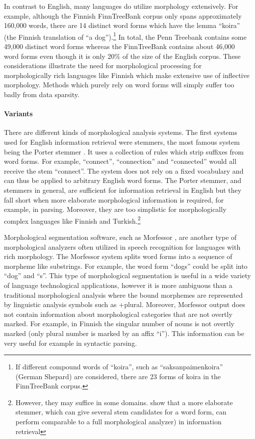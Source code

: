 In contrast to English, many languages do utilize morphology
extensively. For example, although the Finnish FinnTreeBank corpus
\citep{Voutilainen2011} only spans approximately 160,000 words, there
are 14 distinct word forms which have the lemma ``koira'' (the Finnish
translation of ``a dog'').\footnote{If different compound words of
  ``koira'', such as ``saksanpaimenkoira'' (German Shepard) are
  considered, there are 23 forms of koira in the FinnTreeBank corpus.}
In total, the Penn Treebank contains some 49,000 distinct word forms
whereas the FinnTreeBank contains about 46,000 word forms even though
it is only 20\% of the size of the English corpus. These
considerations illustrate the need for morphological processing for
morphologically rich languages like Finnish which make extensive use
of inflective morphology. Methods which purely rely on word forms will
simply suffer too badly from data sparsity.

\paragraph{Variants} There are different kinds of morphological analysis
systems. The first systems used for English information retrieval were
stemmers, the most famous system being the Porter stemmer
\citep{Porter1997}. It uses a collection of rules which strip suffixes
from word forms. For example, ``connect'', ``connection'' and
``connected'' would all receive the stem ``connect''. The system does
not rely on a fixed vocabulary and can thus be applied to arbitrary
English word forms. The Porter stemmer, and stemmers in general, are
sufficient for information retrieval in English but they fall short
when more elaborate morphological information is required, for
example, in parsing. Moreover, they are too simplistic for
morphologically complex languages like Finnish and
Turkish.\footnote{However, they may suffice in some
  domains. \cite{Kettunen2005} show that a more elaborate stemmer,
  which can give several stem candidates for a word form, can perform
  comparable to a full morphological analyzer) in information
  retrieval}

Morphological segmentation software, such as Morfessor
\citep{Creutz2002}, are another type of morphological analyzers often
utilized in speech recognition for languages with rich morphology. The
Morfessor system splits word forms into a sequence of morpheme like
substrings. For example, the word form ``dogs'' could be split into
``dog'' and ``s''.  This type of morphological segmentation is useful
in a wide variety of language technological applications, however it
is more ambiguous than a traditional morphological analysis where the
bound morphemes are represented by linguistic analysis symbols such as
+plural. Moreover, Morfessor output does not contain information about
morphological categories that are not overtly marked. For example, in
Finnish the singular number of nouns is not overtly marked (only
plural number is marked by an affix ``i''). This information can
 be very useful for example in syntactic parsing.

